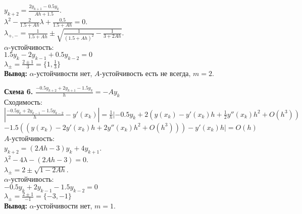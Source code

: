 \documentclass[14pt,a4paper]{extarticle}
\newcommand{\1}{\mathbbm{1}}
\begin{document}
$y_{k+2} = \frac{2 y_{k+1} - 0.5 y_{k}}{A h + 1.5} $.\\
$\lambda^2 - \frac{2}{1.5 + Ah} \lambda + \frac{0.5}{1.5 + Ah} = 0$.\\
$\lambda_{+, -} = \frac{1}{1.5 + Ah} \pm \sqrt{\frac{1}{(1.5 + Ah)^2} - \frac{1}{3 + 2 Ah} }$. \\
$\alpha$-устойчивость:\\ 
$1.5 y_k-2 y_{k-1}+0.5 y_{k-2} = 0$ \\ 
$\lambda_{\pm} = \frac{2 \pm 1}{3} = \{1, \frac{1}{3}\}$ \\ 
\textbf{Вывод:} $\alpha$-устойчивости нет, $A$-устойчивость есть не всегда, $m=2$.
\par
\textbf{Схема 6.} $\frac{-0.5 y_{k+2}+2 y_{k+1}-1.5 y_k}{h}= -A y_k$ \\ 
Сходимость:\\
$|\frac{-0.5 y_k + 2 y_{k-1} - 1.5 y_{k-2}}{h} -y'(x_k)| = \frac{1}{h} |-0.5 y_k+2(y(x_k) - y'(x_k)h +\frac{1}{2} y''(x_k)h^2 + O(h^3))$
$-1.5 ((y(x_k) - 2 y'(x_k)h +2 y''(x_k)h^2 + O(h^3))) -y'(x_k) h| = O(h)$\\
$A$-устойчивость:\\ 
$y_{k+2} = (2 A h - 3) y_k + 4 y_{k+1}$.\\
$\lambda^2  - 4 \lambda - (2 A h - 3) = 0$.\\
$\lambda_{\pm} = 2 \pm \sqrt{1 - 2 A h}$.\\
$\alpha$-устойчивость:\\ 
$-0.5 y_k+2 y_{k-1}-1.5 y_{k-2} = 0$ \\ 
$\lambda_{\pm} = \frac{2 \pm 1}{-1} = \{-3, -1\}$ \\ 
\textbf{Вывод:} $\alpha$-устойчивости нет, $m=1$.
\end{document}
